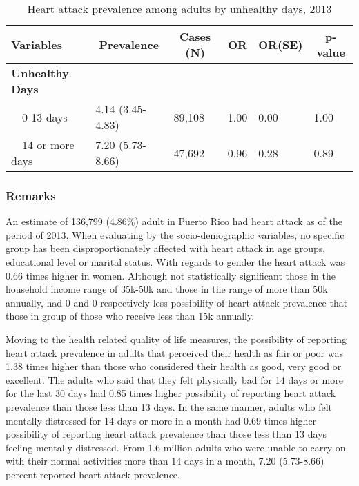 \begin{table}[H]
\caption{Heart attack prevalence among adults by unhealthy days, 2013\label{tab:unhlthy.Heart_Attack.2013}} 
\begin{center}
\begin{tabular}{llllll}
\hline\hline
\multicolumn{1}{l}{Variables}&\multicolumn{1}{c}{Prevalence}&\multicolumn{1}{c}{Cases (N)}&\multicolumn{1}{c}{OR}&\multicolumn{1}{c}{OR(SE)}&\multicolumn{1}{c}{p-value}\tabularnewline
\hline
{\bfseries Unhealthy Days}&&&&&\tabularnewline
~~0-13 days&4.14 (3.45-4.83)&89,108&1.00&0.00&1.00\tabularnewline
~~14 or more days&7.20 (5.73-8.66)&47,692&0.96&0.28&0.89\tabularnewline
\hline
\end{tabular}\end{center}

\end{table}


 \subsubsection{Remarks}

An estimate of 136,799 
(4.86\%) adult in Puerto Rico had heart attack as of the period of 2013.
When evaluating by the socio-demographic variables, no specific group has been disproportionately affected with heart attack in age groups, educational level or marital status. With regards to gender the heart attack was 0.66 times higher in women. Although not statistically significant those in the household income range of 35k-50k and those in the range of more than 50k annually, had 0 and 0 respectively less possibility of heart attack prevalence that those  in group of those who receive less than 15k annually.

Moving to the health related quality of life measures, the possibility of reporting heart attack prevalence in adults that perceived their health as fair or poor was 1.38 times higher than those who considered their health as good, very good or excellent. The adults who said that they felt physically bad for 14 days or more for the last 30 days had 0.85 times higher possibility of reporting heart attack prevalence than those less than 13 days. In the same manner, adults who felt mentally distressed for 14 days or more in a month had 0.69 times higher possibility of reporting heart attack prevalence than those less than 13 days feeling mentally distressed. From 1.6 million adults who were unable to carry on with their normal activities more than 14 days in a month, 7.20 (5.73-8.66) percent reported heart attack prevalence. 

